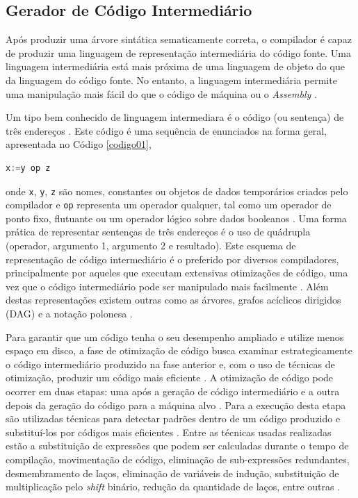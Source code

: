 \subsection{Gerador de Código Intermediário}

Após produzir uma árvore sintática sematicamente correta, o compilador é capaz de
 produzir uma linguagem de representação intermediária do código fonte. Uma linguagem 
intermediária está mais próxima de uma linguagem de objeto do que da linguagem do código fonte. 
No entanto, a linguagem  intermediária permite uma manipulação mais fácil do que o 
código de máquina ou o \textit{Assembly} \cite[pág. 8]{ref25}. 

Um tipo bem conhecido de linguagem intermediara é o código (ou sentença) de três 
endereços \cite[pág. 247]{ref26}. Este código é uma sequência de enunciados na forma geral, apresentada 
 no Código \ref{codigo01},

\begin{lstlisting}[language=C++,caption={Código de três endereços},
											label=codigo01]
   x:=y op z
\end{lstlisting}
onde \texttt{x}, \texttt{y}, \texttt{z} são nomes, constantes ou objetos de dados 
temporários criados pelo compilador e \texttt{op} representa um operador qualquer,
 tal como um operador de ponto fixo, flutuante ou um operador lógico sobre dados
 booleanos \cite[pág. 201]{ref6}. Uma forma prática de representar sentenças de três endereços é o uso
 de quádrupla (operador, argumento 1, argumento 2 e resultado). 
Este esquema de representação de código intermediário é o preferido por diversos
 compiladores, principalmente por aqueles que executam extensivas otimizações de
 código, uma vez que o código intermediário pode ser manipulado mais 
facilmente \cite[pág. 604]{ref5}. Além destas representações existem outras como as 
árvores, grafos acíclicos dirigidos (DAG) e a notação polonesa \cite[pág. 96]{ref29}.

Para garantir que um código tenha o seu desempenho ampliado e utilize menos 
espaço em disco, a fase de otimização de código busca examinar 
estrategicamente o código intermediário produzido na fase anterior e, com o 
uso de técnicas de otimização, produzir um código mais eficiente \cite[pág. 796]{ref30}
. A otimização de código pode ocorrer em duas etapas: uma após a geração de 
código intermediário e a outra depois da geração do código para a máquina 
alvo \cite[pág. 34]{ref6}. 
Para a execução desta etapa são utilizadas técnicas para detectar 
padrões dentro de um código produzido e substituí-los por códigos mais
 eficientes \cite[pág. 604]{ref5}. Entre as técnicas usadas realizadas estão a 
substituição de expressões que podem ser calculadas durante o tempo 
de compilação, movimentação de código, eliminação de sub-expressões 
redundantes, desmembramento de laços, eliminação de variáveis de indução, 
substituição de multiplicação pelo \textit{shift} binário, redução da 
quantidade de laços, entre outras \cite[pág. 796]{ref30}.


